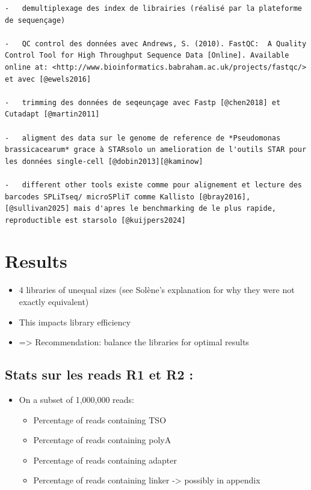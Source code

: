 \documentclass[
  11pt,
  a4paper,
]{report}
\providecommand{\tightlist}{%
  \setlength{\itemsep}{0pt}\setlength{\parskip}{0pt}}\usepackage{longtable,booktabs,array}
\begin{document}
\begin{verbatim}
-   demultiplexage des index de librairies (réalisé par la plateforme de sequençage)

-   QC control des données avec Andrews, S. (2010). FastQC:  A Quality Control Tool for High Throughput Sequence Data [Online]. Available online at: <http://www.bioinformatics.babraham.ac.uk/projects/fastqc/> et avec [@ewels2016]

-   trimming des données de seqeunçage avec Fastp [@chen2018] et Cutadapt [@martin2011]

-   aligment des data sur le genome de reference de *Pseudomonas brassicacearum* grace à STARsolo un amelioration de l'outils STAR pour les données single-cell [@dobin2013][@kaminow]

-   different other tools existe comme pour alignement et lecture des barcodes SPLiTseq/ microSPliT comme Kallisto [@bray2016], [@sullivan2025] mais d'apres le benchmarking de le plus rapide, reproductible est starsolo [@kuijpers2024]
\end{verbatim}


\chapter{Results}\label{results}

\begin{itemize}
\tightlist
\item
  4 libraries of unequal sizes (see Solène's explanation for why they
  were not exactly equivalent)
\item
  This impacts library efficiency
\item
  =\textgreater{} Recommendation: balance the libraries for optimal
  results
\end{itemize}

\section{Stats sur les reads R1 et R2
:}\label{stats-sur-les-reads-r1-et-r2}

\begin{itemize}
\tightlist
\item
  On a subset of 1,000,000 reads:

  \begin{itemize}
  \tightlist
  \item
    Percentage of reads containing TSO
  \item
    Percentage of reads containing polyA
  \item
    Percentage of reads containing adapter
  \item
    Percentage of reads containing linker -\textgreater{} possibly in
    appendix
  \end{itemize}
\end{itemize}
\end{document}
